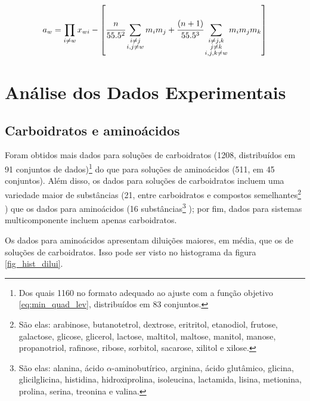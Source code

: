 \documentclass[
	12pt,				%
	openright,
	twoside,
	a4paper,			%
	english,			%
	french,				%
	spanish,			%
	brazil				%
	]{abntex2}
\begin{document}
\begin{equation}
	\label{eq_caurie_raoult}
	a_w = \prod_{i \neq w}x_{wi}-\left[\cfrac{n}%
	{55.5^2}\sum_{\substack{i \neq j \\ i,j \neq w}}%
	m_im_j + \cfrac{(n+1)}{55.5^3}\sum_{%
	\substack{i\neq j,k \\ j \neq k \\  i,j,k \neq w}}%
	m_im_jm_k\right]
\end{equation}



\chapter{Análise dos Dados Experimentais}

\section{Carboidratos e aminoácidos}

Foram obtidos mais dados para soluções de carboidratos (1208, distribuídos em
91 conjuntos de dados)\footnote{%
	Dos quais 1160 no formato adequado ao ajuste com a função objetivo
	\ref{eq:min_quad_lev}, distribuídos em 83 conjuntos.
}
do que para soluções de aminoácidos (511, em 45 conjuntos). Além disso, os dados
para soluções de carboidratos incluem uma variedade maior de substâncias (21,
entre carboidratos e compostos semelhantes\footnote{%
	São elas: arabinose, butanotetrol, dextrose, eritritol, etanodiol,
	frutose, galactose, glicose, glicerol, lactose, maltitol, maltose,
	manitol, manose, propanotriol, rafinose, ribose, sorbitol, sacarose,
	xilitol e xilose.
}
) que os dados para aminoácidos (16 substâncias\footnote{%
	São elas: alanina, ácido $\alpha$-aminobutírico, arginina, ácido
	glutâmico, glicina, glicilglicina, histidina, hidroxiprolina,
	isoleucina, lactamida, lisina, metionina, prolina, serina,
	treonina e valina.
}
); por fim, dados para sistemas multicomponente incluem apenas carboidratos.

Os dados para aminoácidos apresentam diluições maiores, em média, que os de
soluções de carboidratos. Isso pode ser visto no histograma da figura
\ref{fig_hist_dilui}.
\end{document}
